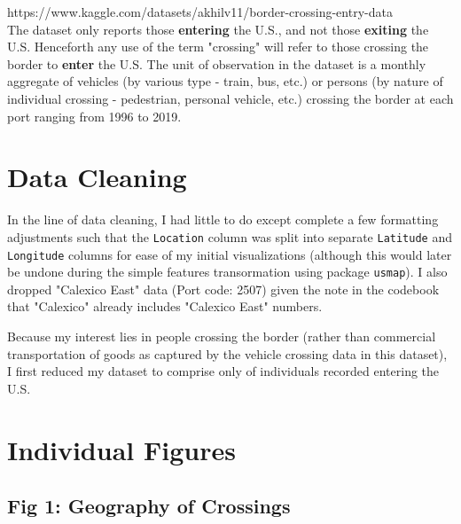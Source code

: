 \documentclass[12pt,letterpaper]{article}
\begin{document}
	 {https://www.kaggle.com/datasets/akhilv11/border-crossing-entry-data} \\
	  
	 The dataset only reports those \textbf{entering} the U.S., and not those \textbf{exiting} the U.S. Henceforth any use of the term "crossing" will refer to those crossing the border to \textbf{enter} the U.S. The unit of observation in the dataset is a monthly aggregate of vehicles (by various type - train, bus, etc.) or persons (by nature of individual crossing - pedestrian, personal vehicle, etc.) crossing the border at each port ranging from 1996 to 2019.\\
	
	 
	\section*{Data Cleaning}
	In the line of data cleaning, I had little to do except complete a few formatting adjustments such that the \texttt{Location} column was split into separate \texttt{Latitude} and \texttt{Longitude} columns for ease of my initial visualizations (although this would later be undone during the simple features transormation using package \texttt{usmap}). I also dropped "Calexico East" data (Port code: 2507) given the note in the codebook that "Calexico" already includes "Calexico East" numbers. 
	
	
	
	Because my interest lies in people crossing the border (rather than commercial transportation of goods as captured by the vehicle crossing data in this dataset), I first reduced my dataset to comprise only of individuals recorded entering the U.S.\\
	
	


	\section*{Individual Figures}

	\subsection*{Fig 1: Geography of Crossings}
		
\end{document}
